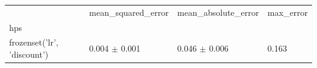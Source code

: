 \begin{tabular}{llll}
\toprule
 & mean_squared_error & mean_absolute_error & max_error \\
hps &  &  &  \\
\midrule
frozenset({'lr', 'discount'}) & 0.004 $\pm$ 0.001 & 0.046 $\pm$ 0.006 & 0.163 \\
\bottomrule
\end{tabular}
